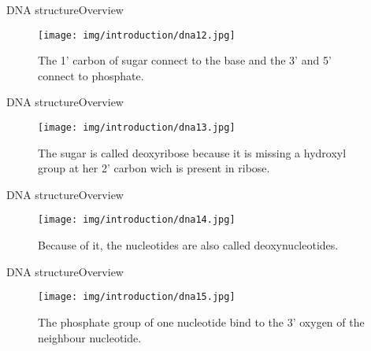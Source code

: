 \documentclass[10pt]{beamer}
\newcommand{\1}{
	\setbeamertemplate{background}{
		\texttt{[image: img/1]}
		\tikz[overlay] \fill[fill opacity=0.75,fill=white] (0,0) rectangle (-\paperwidth,\paperheight);
	}
}
\begin{document}
\begin{frame}{DNA structure}{Overview}
	\begin{figure}[]
		\centering
		\texttt{[image: img/introduction/dna12.jpg]}
		\label{img:mot2}
		\caption{The 1' carbon of sugar connect to the base and the 3' and 5' connect to phosphate. }
	\end{figure}
\end{frame}

\begin{frame}{DNA structure}{Overview}
	\begin{figure}[]
		\centering
		\texttt{[image: img/introduction/dna13.jpg]}
		\label{img:mot2}
		\caption{The sugar is called deoxyribose because it is missing a hydroxyl group at her 2' carbon wich is present in ribose.}
	\end{figure}
\end{frame}

\begin{frame}{DNA structure}{Overview}
	\begin{figure}[]
		\centering
		\texttt{[image: img/introduction/dna14.jpg]}
		\label{img:mot2}
		\caption{Because of it, the nucleotides are also called deoxynucleotides.}
	\end{figure}
\end{frame}

\begin{frame}{DNA structure}{Overview}
	\begin{figure}[]
		\centering
		\texttt{[image: img/introduction/dna15.jpg]}
		\label{img:mot2}
		\caption{The phosphate group of one nucleotide bind to the 3' oxygen of the neighbour nucleotide.}
	\end{figure}
\end{frame}
\end{document}
